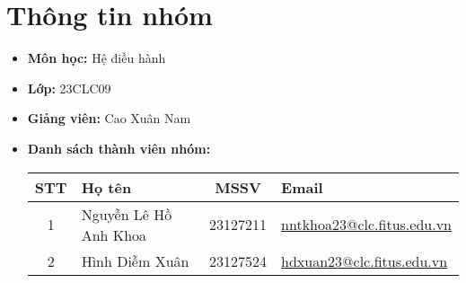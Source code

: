 \section{Thông tin nhóm}
\begin{itemize}
	\item \textbf{Môn học: } Hệ điều hành
	\item \textbf{Lớp: } 23CLC09
	\item \textbf{Giảng viên: } Cao Xuân Nam
	\item \textbf{Danh sách thành viên nhóm: }
	      \begin{center}
		      \renewcommand{\arraystretch}{1.5}
		      \begin{tabular}{|c|l|c|l|}
			      \hline
			      \textbf{STT} & \textbf{Họ tên}       & \textbf{MSSV} & \textbf{Email}                                                        \\\hline
			      1            & Nguyễn Lê Hồ Anh Khoa & 23127211      & \href{mailto:nlhakhoa23@clc.fitus.edu.vn}{nntkhoa23@clc.fitus.edu.vn} \\\hline
			      2            & Hình Diễm Xuân        & 23127524      & \href{mailto:bmduy23@clc.fitus.edu.vn}{hdxuan23@clc.fitus.edu.vn}     \\\hline
		      \end{tabular}
	      \end{center}
\end{itemize}
